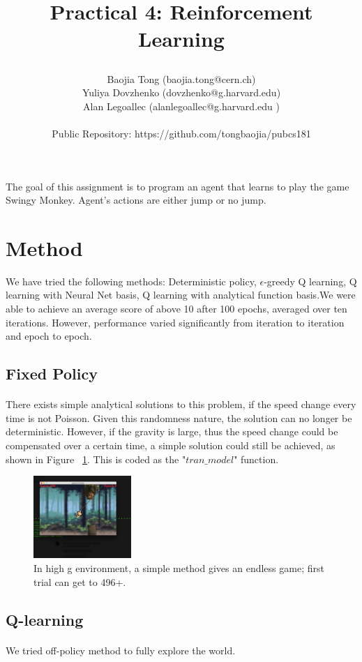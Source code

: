 \documentclass[11pt]{article}
\title{\begin{center}
{\Large Practical 4: Reinforcement Learning}
\end{center}}
\author{ Baojia Tong (baojia.tong@cern.ch)\\Yuliya Dovzhenko (dovzhenko@g.harvard.edu)\\Alan Legoallec (alanlegoallec@g.harvard.edu )\\\\Public Repository: https://github.com/tongbaojia/pubcs181}
\begin{document}
\maketitle{}
The goal of this assignment is to program an agent that learns to play the game Swingy Monkey. Agent's actions are either jump or no jump. 
\section{Method}
We have tried the following methods: Deterministic policy, $\epsilon$-greedy Q learning, Q learning with Neural Net basis, Q learning with analytical function basis.We were able to achieve an average score of above 10 after 100 epochs, averaged over ten iterations. However, performance varied significantly from iteration to iteration and epoch to epoch.
\subsection{Fixed Policy}
\paragraph{}
There exists simple analytical solutions to this problem, if the speed change every time is not Poisson. Given this randomness nature, the solution can no longer be deterministic. However, if the gravity is large, thus the speed change could be compensated over a certain time, a simple solution could still be achieved, as shown in Figure ~\ref{FixedPolicy}. This is coded as the "$tran\_model$" function.
\begin{figure}[] 
\centering
        \includegraphics[width=0.33\textwidth]{Plot/highscore.png}
        \caption{In high g environment, a simple method gives an endless game; first trial can get to 496+.}
            \label{FixedPolicy}
\end{figure}
\subsection{Q-learning}
\paragraph{}
We tried off-policy method to fully explore the world.
\end{document}
